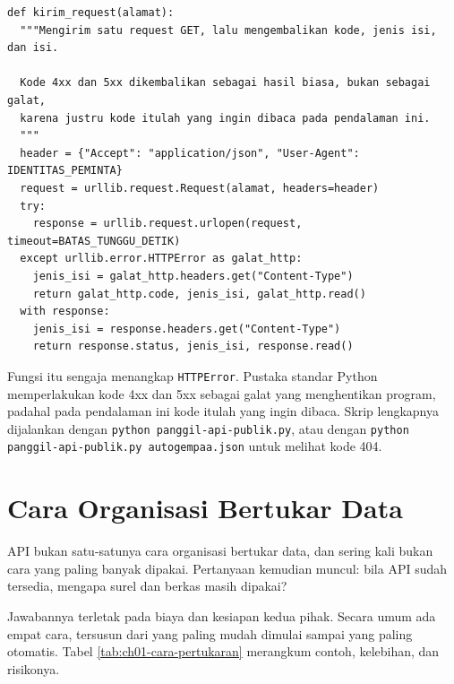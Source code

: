 \begin{pendalaman}
\begin{lstlisting}[style=ch01python, caption={Mengirim request dan membaca kode status, tersedia di \berkas{sources/chapter01/panggil-api-publik.py}}, label={lst:ch01-kirim-request}]
def kirim_request(alamat):
  """Mengirim satu request GET, lalu mengembalikan kode, jenis isi, dan isi.

  Kode 4xx dan 5xx dikembalikan sebagai hasil biasa, bukan sebagai galat,
  karena justru kode itulah yang ingin dibaca pada pendalaman ini.
  """
  header = {"Accept": "application/json", "User-Agent": IDENTITAS_PEMINTA}
  request = urllib.request.Request(alamat, headers=header)
  try:
    response = urllib.request.urlopen(request, timeout=BATAS_TUNGGU_DETIK)
  except urllib.error.HTTPError as galat_http:
    jenis_isi = galat_http.headers.get("Content-Type")
    return galat_http.code, jenis_isi, galat_http.read()
  with response:
    jenis_isi = response.headers.get("Content-Type")
    return response.status, jenis_isi, response.read()
\end{lstlisting}

Fungsi itu sengaja menangkap \texttt{HTTPError}. Pustaka standar Python
memperlakukan kode 4xx dan 5xx sebagai galat yang menghentikan program, padahal
pada pendalaman ini kode itulah yang ingin dibaca. Skrip lengkapnya dijalankan
dengan \texttt{python panggil-api-publik.py}, atau dengan
\texttt{python panggil-api-publik.py autogempaa.json} untuk melihat kode 404.
\end{pendalaman}

\section{Cara Organisasi Bertukar Data}

API bukan satu-satunya cara organisasi bertukar data, dan sering kali bukan cara
yang paling banyak dipakai. Pertanyaan kemudian muncul: bila API sudah tersedia,
mengapa surel dan berkas masih dipakai?

Jawabannya terletak pada biaya dan kesiapan kedua pihak. Secara umum ada empat
cara, tersusun dari yang paling mudah dimulai sampai yang paling otomatis. Tabel
\ref{tab:ch01-cara-pertukaran} merangkum contoh, kelebihan, dan risikonya.

